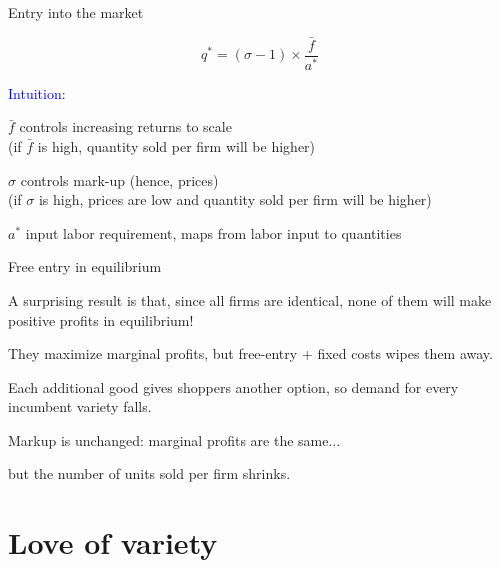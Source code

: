 \documentclass[notes,11pt, aspectratio=169, xcolor=table]{beamer}
\newcommand{\blue}[1]{\textcolor{blue}{#1}}
\newenvironment{wideitemize}{\itemize\addtolength{\itemsep}{10pt}}{\enditemize}
\begin{document}
\begin{frame}{Entry into the market}

 
    \begin{equation*}
    \boxed{
        q^* = (\sigma-1) \times \frac{\bar{f}}{a^*}
    }
    \end{equation*}

    \blue{Intuition}:
    \begin{wideitemize}

    \item<2-> $\bar{f}$ controls increasing returns to scale \\
        \qquad (if $\bar{f}$ is high, quantity sold per firm will be higher)

    \item<3-> $\sigma$ controls mark-up (hence, prices) \\
        \qquad (if $\sigma$ is high, prices are low and quantity sold per firm will be higher)

    \item<4-> $a^*$ input labor requirement, maps from labor input to quantities

    \end{wideitemize}
    
\end{frame}

\begin{frame}{Free entry in equilibrium}
    \begin{wideitemize}
        \item A surprising result is that, since all firms are identical, none of them will make positive profits in equilibrium!
        \item They maximize marginal profits, but free-entry + fixed costs wipes them away.
        \item Each additional good gives shoppers another option, so demand for every incumbent variety falls.
        \item Markup is unchanged: marginal profits are the same...
        \item but the number of units sold per firm shrinks.
    \end{wideitemize}
\end{frame}

\section{Love of variety}
\end{document}
